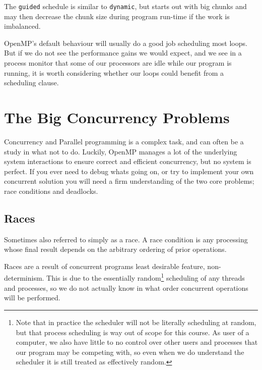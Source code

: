 The \texttt{guided} schedule is similar to \texttt{dynamic}, but
starts out with big chunks and may then decrease the chunk size during
program run-time if the work is imbalanced.

OpenMP's default behaviour will usually do a good job scheduling most
loops.  But if we do not see the performance gains we would expect,
and we see in a process monitor that some of our processors are idle
while our program is running, it is worth considering whether our
loops could benefit from a scheduling clause.

\section{The Big Concurrency Problems}

Concurrency and Parallel programming is a complex task, and can often be 
a study in what not to do. Luckily, OpenMP manages a lot of the underlying system interactions to ensure correct and efficient concurrency, but no system is perfect. If you ever need to debug whats going on, or try to implement your own concurrent solution you will need a firm understanding of the two core problems; race conditions and deadlocks.

\subsection{Races}

\begin{definition}
  Sometimes also referred to simply as a race. A race condition is any processing whose final result depends on the arbitrary ordering of prior operations.
\end{definition}

Races are a result of concurrent programs least desirable feature, non-determinism. This is due to the essentially random\footnote{Note that in practice the scheduler will not be literally scheduling at random, but that process scheduling is way out of scope for this course. As user of a computer, we also have little to no control over other users and processes that our program may be competing with, so even when we do understand the scheduler it is still treated as effectively random.} scheduling of any threads and processes, so we do not actually know in what order concurrent operations will be performed.

